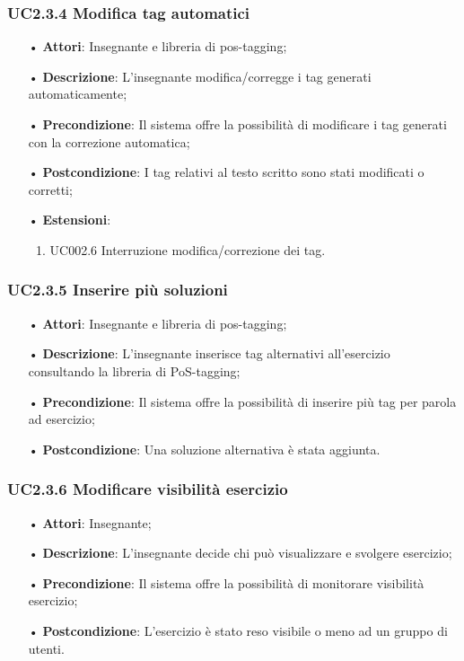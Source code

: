 \subsubsection{UC2.3.4	Modifica tag automatici}
\begin{itemize}
	\item[•] \textbf{Attori}: Insegnante e libreria di pos-tagging;
	\item[•] \textbf{Descrizione}: L’insegnante modifica/corregge i tag generati automaticamente;
	\item[•] \textbf{Precondizione}: Il sistema offre la possibilità di modificare i tag generati con la correzione automatica;
	\item[•] \textbf{Postcondizione}: I tag relativi al testo scritto sono stati modificati o corretti;
	\item[•] \textbf{Estensioni}:
	\begin{enumerate}
		\item UC002.6 Interruzione modifica/correzione dei tag.
	
	\end{enumerate}
\end{itemize}

\subsubsection{UC2.3.5	Inserire più soluzioni}
\begin{itemize}
	\item[•] \textbf{Attori}: Insegnante e libreria di pos-tagging;
	\item[•] \textbf{Descrizione}: L'insegnante inserisce tag alternativi all’esercizio consultando la libreria di PoS-tagging;
	\item[•] \textbf{Precondizione}: Il sistema offre la possibilità di inserire più tag per parola ad 
			esercizio;
	\item[•] \textbf{Postcondizione}: Una soluzione alternativa è stata aggiunta.
\end{itemize}

\subsubsection{UC2.3.6	Modificare visibilità esercizio}
\begin{itemize}
	\item[•] \textbf{Attori}: Insegnante;
	\item[•] \textbf{Descrizione}: L'insegnante decide chi può visualizzare e svolgere esercizio;
	\item[•] \textbf{Precondizione}: Il sistema offre la possibilità di monitorare visibilità esercizio;
	\item[•] \textbf{Postcondizione}: L’esercizio è stato reso visibile o meno ad un gruppo di utenti.
\end{itemize}

